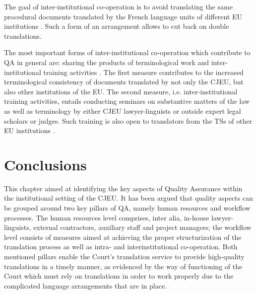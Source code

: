 \documentclass[output=paper]{langsci/langscibook}
\begin{document}
The goal of inter-institutional co-operation is to avoid translating the same procedural documents translated by the French language units of different EU institutions \citep[3]{Annex2010}. Such a form of an arrangement allows to cut back on double translations.

The most important forms of inter-institutional co-operation which contribute to QA in general are: sharing the products of terminological work and inter-institutional training activities \citep[3]{Annex2010}. The first measure contributes to the increased terminological consistency of documents translated by not only the CJEU, but also other institutions of the EU. The second measure, i.e. inter-institutional training activities, entails conducting seminars on substantive matters of the law as well as terminology by either CJEU lawyer-linguists or outside expert legal scholars or judges. Such training is also open to translators from the TSs of other EU institutions \citep[3]{Annex2010}.

\section{Conclusions}\label{sec:kozbial:5}

This chapter aimed at identifying the key aspects of Quality Assurance within the institutional setting of the CJEU. It has been argued that quality aspects can be grouped around two key pillars of QA, namely human resources and workflow processes. The human resources level comprises, inter alia, in-house lawyer-linguists, external contractors, auxiliary staff and project managers; the workflow level consists of measures aimed at achieving the proper structurization of the translation process as well as intra- and interinstitutional co-operation. Both mentioned pillars enable the Court’s translation service to provide high-quality translations in a timely manner, as evidenced by the way of functioning of the Court which must rely on translations in order to work properly due to the complicated language arrangements that are in place.
\end{document}
